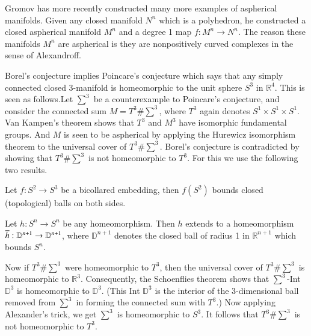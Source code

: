 Gromov \cite{54} has more recently constructed many more examples of
aspherical manifolds. Given any closed manifold $N^n$ which is a
polyhedron, he constructed a closed aspherical manifold\pageoriginale
$M^n$ and a degree 1 map $f: M^n \to N^n$. The reason these manifolds
$M^n$ are aspherical is they are nonpositively curved complexes in the
sense of Alexandroff.

\begin{remark*}
  Borel's conjecture implies Poincare's conjecture which says that any
  simply connected closed 3-manifold is homeomorphic to the unit
  sphere $S^3$ in $\mathbb{R}^4$. This is seen as follows.Let $\sum^3$
  be a counterexample to Poincare's conjecture, and consider the
  connected sum $M=T^3 \# \sum^3$, where $T^3$ again denotes $S^1
  \times S^1 \times S^1$. Van Kampen's theorem shows that $T^3$ and
  $M^3$ have isomorphic fundamental groups. And $M$ is seen to be
  aspherical by applying the Hurewicz isomorphism theorem to the
  universal cover of $T^3 \# \sum^3$. Borel's conjecture is
  contradicted by showing that $T^3\# \sum^3$ is not homeomorphic to
  $T^3$. For this we use the following two results.
\end{remark*}

\setcounter{lemma}{4}
\begin{thm}\label{c1:thm1.5}
  Let $f: S^2 \to S^3$ be a bicollared embedding, then $f(S^2)$ bounds
  closed (topological) balls on both sides.
\end{thm}

\begin{thm}\label{c1:thm1.6}
  Let $h: S^n \to S^n$ be any homeomorphism. Then $h$ extends to a
  homeomorphism $\overline{h}: \mathbb{D}^{n+1} \to \mathbb{D}^{n+1}$, where
  $\mathbb{D}^{n+1}$ denotes the closed ball of radius 1 in
  $\mathbb{R}^{n+1}$ which bounds $S^n$.
\end{thm}

Now if $T^3 \# \sum^3$ were homeomorphic to $T^3$, then the universal
cover of $T^3 \# \sum^3$ is homeomorphic to
$\mathbb{R}^3$. Consequently, the Schoenflies theorem shows that
$\sum^3$-Int $\mathbb{D}^3$ is homeomorphic to $\mathbb{D}^3$. (This
Int $\mathbb{D}^3$ is the interior of the 3-dimensional ball removed
from $\sum^3$ in forming the connected sum with $T^3$.) Now applying
Alexander's trick, we get $\sum^3$ is homeomorphic to $S^3$. It
follows that $T^3\# \sum^3$ is not homeomorphic to $T^3$.
